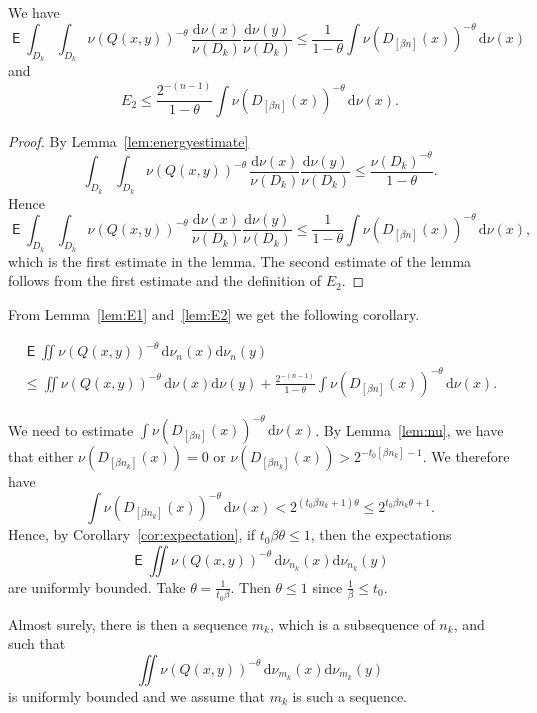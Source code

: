 \documentclass[AHL,Unicode,longabstracts]{cedram}
\DeclareMathOperator{\E}{\mathsf{E}}
\newcommand*{\dd}{\mathrm{d}}
\begin{document}
\begin{lemm}\label{lem:E2}
We have
\[
\E \int_{D_k} \int_{D_k} \nu(Q(x,y))^{-\theta} \, \frac{\dd
\nu (x)}{\nu (D_k)} \frac{\dd \nu (y)}{\nu (D_k)} \leq
\frac{1}{1-\theta} \int \nu (D_{[\beta n]} (x))^{-\theta} \,
\dd \nu (x)
\]
and
\[
E_2 \leq \frac{2^{-(n-1)}}{1-\theta} \int \nu (D_{[\beta n]} (x))^{-\theta} \, \dd \nu (x).
\]
\end{lemm}

\begin{proof}
By Lemma~\ref{lem:energyestimate}
\[
\int_{D_k} \int_{D_k} \nu(Q(x,y))^{-\theta} \, \frac{\dd \nu (x)}{\nu (D_k)} \frac{\dd \nu (y)}{\nu (D_k)} \leq
\frac{\nu (D_k)^{-\theta}}{1-\theta}.
\]
Hence
\[
\E \int_{D_k} \int_{D_k} \nu(Q(x,y))^{-\theta} \, \frac{\dd
\nu (x)}{\nu (D_k)} \frac{\dd \nu (y)}{\nu (D_k)} \leq
\frac{1}{1-\theta} \int \nu (D_{[\beta n]} (x))^{-\theta} \,
\dd \nu (x),
\]
which is the first estimate in the lemma. The second estimate of the lemma follows from the first estimate and the definition of $E_2$.
\end{proof}

From Lemma~\ref{lem:E1} and~\ref{lem:E2} we get the following corollary.

\begin{coro}\label{cor:expectation}
\begin{multline*}
\E \iint \nu (Q(x,y))^{-\theta} \, \dd \nu_n (x) \dd
\nu_n (y) \\ \leq \iint \nu (Q(x,y))^{-\theta} \, \dd \nu (x) \dd \nu (y) + \frac{2^{-(n-1)}}{1-\theta} \int \nu (D_{[\beta n]} (x))^{-\theta} \, \dd \nu (x).
\end{multline*}
\end{coro}

We need to estimate $\int \nu (D_{[\beta n]} (x))^{-\theta} \,
\dd \nu(x)$. By Lemma~\ref{lem:nu}, we have that either $\nu (D_{[\beta n_k]} (x)) = 0$ or $\nu (D_{[\beta n_k]} (x)) > 2^{-t_0 [\beta n_k] - 1}$. We therefore have
\[
\int \nu (D_{[\beta n_k]} (x))^{-\theta} \, \dd \nu(x) < 2^{(t_0 \beta n_k + 1) \theta} \leq 2^{t_0 \beta n_k \theta + 1}.
\]
Hence, by Corollary~\ref{cor:expectation}, if $t_0 \beta \theta \leq 1$, then the expectations
\[
\E \iint \nu (Q(x,y))^{-\theta} \, \dd \nu_{n_k} (x) \dd
\nu_{n_k} (y)
\]
are uniformly bounded. Take $\theta = \frac{1}{t_0 \beta}$. Then $\theta \leq 1$ since $\frac{1}{\beta} \leq t_0$.

Almost surely, there is then a sequence $m_k$, which is a subsequence of $n_k$, and such that
\[
\iint \nu (Q(x,y))^{-\theta} \, \dd \nu_{m_k} (x) \dd
\nu_{m_k} (y)
\]
is uniformly bounded and we assume that $m_k$ is such a sequence.
\end{document}
